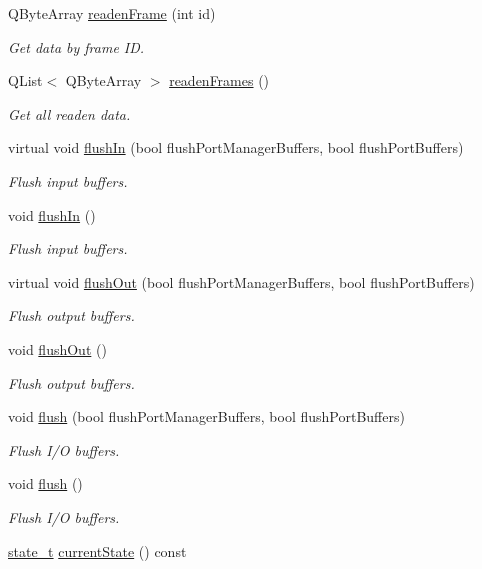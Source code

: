\begin{DoxyCompactItemize}
QByteArray \hyperlink{classmdt_port_manager_a830ae182d06dd6a52c43a7f45b9240ac}{readenFrame} (int id)
\begin{DoxyCompactList}\small\item\em Get data by frame ID. \end{DoxyCompactList}\item 
QList$<$ QByteArray $>$ \hyperlink{classmdt_port_manager_addd5dcae9644cea42a9871205af41796}{readenFrames} ()
\begin{DoxyCompactList}\small\item\em Get all readen data. \end{DoxyCompactList}\item 
virtual void \hyperlink{classmdt_port_manager_ac0844a5cd4043a95a479d458ac7ce590}{flushIn} (bool flushPortManagerBuffers, bool flushPortBuffers)
\begin{DoxyCompactList}\small\item\em Flush input buffers. \end{DoxyCompactList}\item 
void \hyperlink{classmdt_port_manager_a4c44ce6ec40c4afc6be441c10d7ee827}{flushIn} ()
\begin{DoxyCompactList}\small\item\em Flush input buffers. \end{DoxyCompactList}\item 
virtual void \hyperlink{classmdt_port_manager_a3f0c2722a41c49de2bea9013bccd049c}{flushOut} (bool flushPortManagerBuffers, bool flushPortBuffers)
\begin{DoxyCompactList}\small\item\em Flush output buffers. \end{DoxyCompactList}\item 
void \hyperlink{classmdt_port_manager_ab34018a9653a5af784fa7da06a9e50d3}{flushOut} ()
\begin{DoxyCompactList}\small\item\em Flush output buffers. \end{DoxyCompactList}\item 
void \hyperlink{classmdt_port_manager_a97b91e7c1641836eb6afb47fd244a18e}{flush} (bool flushPortManagerBuffers, bool flushPortBuffers)
\begin{DoxyCompactList}\small\item\em Flush I/O buffers. \end{DoxyCompactList}\item 
void \hyperlink{classmdt_port_manager_a3eab774008d7530ae341ce9c38265d65}{flush} ()
\begin{DoxyCompactList}\small\item\em Flush I/O buffers. \end{DoxyCompactList}\item 
\hypertarget{classmdt_port_manager_a59241d9e6b6ee71e6c1aeb3e6c0ca81a}{
\hyperlink{classmdt_port_manager_a9448339d7f08ca5e18b904df25b382da}{state\_\-t} \hyperlink{classmdt_port_manager_a59241d9e6b6ee71e6c1aeb3e6c0ca81a}{currentState} () const }
\label{classmdt_port_manager_a59241d9e6b6ee71e6c1aeb3e6c0ca81a}


\end{DoxyCompactItemize}
